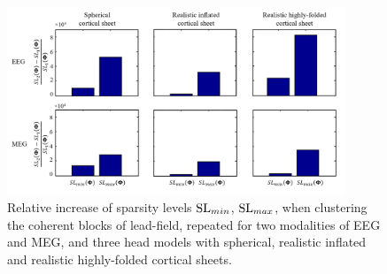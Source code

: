 \begin{figure}[!b]
\centering
\includegraphics[width=0.9\textwidth,keepaspectratio]{images/EMEG-LF-clustering-SL.png} %
\centering
\caption{Relative increase of sparsity levels $\mathrm{SL}_{min}$, $\mathrm{SL}_{max}$, 
when clustering the coherent blocks of lead-field, repeated for two modalities of EEG and MEG, and three head models with spherical, realistic inflated and realistic highly-folded cortical sheets.}
\label{fig:EMEG-LF-clustering-SL}
\end{figure}